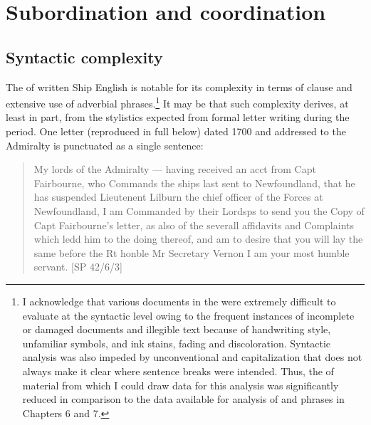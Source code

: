 \section{{Subordination and coordination}}%

\subsection{{Syntactic complexity}}%

The  of written Ship English is notable for its complexity in terms of clause  and extensive use of adverbial phrases.\footnote{I acknowledge that various documents in the  were extremely difficult to evaluate at the syntactic level owing to the frequent instances of incomplete or damaged documents and illegible text because of handwriting style, unfamiliar symbols, and ink stains, fading and discoloration. Syntactic analysis was also impeded by unconventional  and capitalization that does not always make it clear where sentence breaks were intended. Thus, the  of material from which I could draw data for this analysis was significantly reduced in comparison to the data available for analysis of  and  phrases in Chapters 6 and 7.}  It may be that such complexity derives, at least in part, from the stylistics expected from formal letter writing during the period. One letter (reproduced in full below) dated 1700 and addressed to the Admiralty is punctuated as a single sentence: 

\begin{quotation}
My lords of the Admiralty — having received an acct from Capt Fairbourne, who Commands the ships last sent to Newfoundland, that he has suspended Lieutenent Lilburn the chief officer of the Forces at Newfoundland, I am Commanded by their Lordsps to send you the Copy of Capt Fairbourne’s letter, as also of the severall affidavits and Complaints which ledd him to the doing thereof, and am to desire that you will lay the same before the Rt honble Mr Secretary Vernon I am your most humble servant. [SP 42/6/3] 
\end{quotation}

